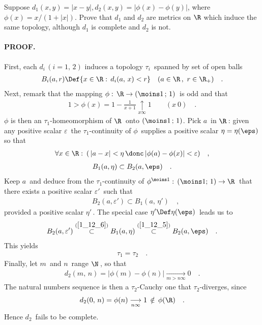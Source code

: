 {\CMUCS Suppose $d_{1}(x,y)=|x-y|, d_{2}(x,y)=|\phi(x)-\phi(y)|$, where $\phi(x)={x}/{(1+\lvert x \rvert )}$. Prove that $d_{1}$ and $d_{2}$ are metrics on $\R$ which induce the same topology, although $d_{1}$ is complete and $d_{2}$ is not.}
\paragraph{PROOF.} First, each $d_i\, (i=1,\,2)$ induces a topology $\tau_i\,$ spanned by set of open balls 
\begin{align}\label{1_12_2}
B_i(a,r)\Def \{ x\in \R:\, d_i (a,\,x) < r\} \quad (a\in \R\,,\, \, r\in \R_+ )\quad . \end{align}
Next, remark that the mapping $\phi:\,  \R\to (\moins 1\, ;\,1)\,$ is odd and that
\begin{align}\label{1_12_1}
1> \phi(x)=1-\frac{1}{x+1} \underset{x\infty}{\uparrow} 1 \quad \quad (x\> 0) \quad.
\end{align}
$\phi$ is then an $\tau_1$-homeomorphism of $\R\,$ onto $(\moins 1\,;\, 1)$. Pick $a\,$ in $\R\,$: given any positive scalar $\varepsilon\,$ the $\tau_1$-continuity of $\phi\,$ supplies a positive scalar $\eta=\eta(\eps)\,$ so that 
\begin{align}
\forall x \in\R:\: (\, |a-x|< \eta \,\donc\, |\phi(a)-\phi(x)|< \varepsilon)\quad , \end{align}
\ie
\begin{align}\label{1_12_5}
B_1(a,\eta)\subset B_2(a,\eps)\quad  .\end{align}
Keep $a\,$ and deduce from the $\tau_1$-continuity of $\phi^{\moins 1}:\, (\moins 1;\, 1)\to \R\,$ that there exists a positive scalar $\varepsilon'\,$ such that 
\begin{align} \label{1_12_6}
\quad B_{2}(a,\varepsilon')\subset B_{1}(a,\,\eta')  \quad  ,\end{align}
provided a positive scalar $\eta'\,$. The special case $\eta' \Def \eta(\eps)\,$ leads us to 
\begin{align}
B_{2}(a,\varepsilon')\overset{(\ref{1_12_6})}{\subset} B_{1}(a,\eta ) \overset{(\ref{1_12_5})}{\subset} B_2(a,\eps)\quad . \end{align}
This yields
\begin{align}\tau_1=\tau_2 \quad . \end{align}
Finally, let $m\,$ and $n\,$ range $\N\,$, so that
\begin{align}
\quad d_{2}(m,\,n)=|\phi(m)-\phi(n)| {\underset{m> n \infty}{\longrightarrow}}0\quad .
\quad \end{align}
The natural numbers sequence is then a $\tau_2$-Cauchy one that $\tau_2$-diverges, since
\begin{align}
d_{2}(0,\,n) = \phi (n) \underset{n\infty}{\longrightarrow}1 \, \notin \, \phi(\R) \quad .\end{align}
Hence $d_2\,$ fails to be complete.\QED